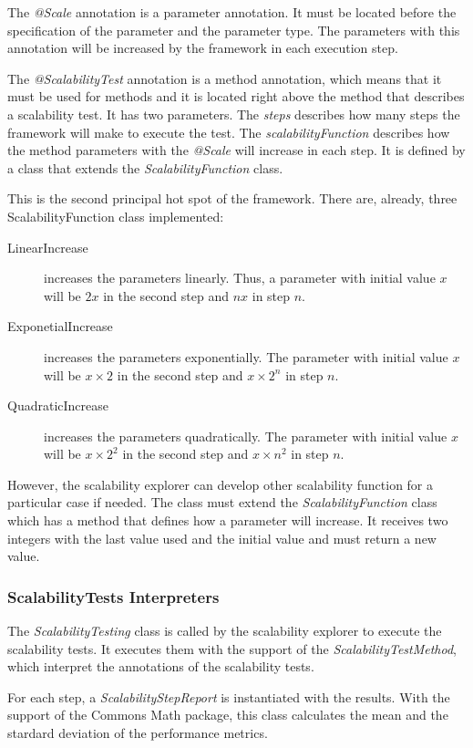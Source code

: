 The \emph{@Scale} annotation is a parameter annotation. It must be located before the specification of the parameter and the parameter type. The parameters with this annotation will be increased by the framework in each execution step.

The \emph{@ScalabilityTest} annotation is a method annotation, which means that it must be used for methods and it is located right above the method that describes a scalability test. It has two parameters. The \emph{steps} describes how many steps the framework will make to execute the test. The \emph{scalabilityFunction} describes how the method parameters with the \emph{@Scale} will increase in each step. It is defined by a class that extends the \emph{ScalabilityFunction} class.

This is the second principal hot spot of the framework. There are, already, three ScalabilityFunction class implemented:
\begin{description}
\item[LinearIncrease] increases the parameters linearly. Thus, a parameter with initial value $x$ will be $2x$ in the second step and $nx$ in step $n$.
\item[ExponetialIncrease] increases the parameters exponentially. The parameter with initial value $x$ will be $x \times 2$ in the second step and $x \times 2^n$ in step $n$.
\item[QuadraticIncrease] increases the parameters quadratically. The parameter with initial value $x$ will be $x \times 2^2$ in the second step and $x \times n^2$ in step $n$.
\end{description}

However, the scalability explorer can develop other scalability function for a particular case if needed. The class must extend the \emph{ScalabilityFunction} class which has a method that defines how a parameter will increase. It receives two integers with the last value used and the initial value and must return a new value.

\subsubsection{ScalabilityTests Interpreters}
The \emph{ScalabilityTesting} class is called by the scalability explorer to execute the scalability tests. It executes them with the support of the \emph{ScalabilityTestMethod}, which interpret the annotations of the scalability tests.

For each step, a \emph{ScalabilityStepReport} is instantiated with the results. With the support of the Commons Math package, this class calculates the mean and the stardard deviation of the performance metrics.

